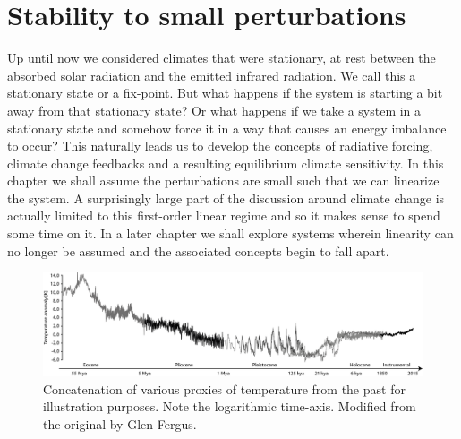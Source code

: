 \documentclass[12pt]{book}
\begin{document}
\chapter{Stability to small perturbations}

Up until now we considered climates that were stationary, at rest between the absorbed solar radiation and the emitted infrared radiation. We call this a stationary state or a fix-point. But what happens if the system is starting a bit away from that stationary state? Or what happens if we take a system in a stationary state and somehow force it in a way that causes an energy imbalance to occur? This naturally leads us to develop the concepts of radiative forcing, climate change feedbacks and a resulting equilibrium climate sensitivity.
In this chapter we shall assume the perturbations are small such that we can linearize the system.  A surprisingly large part of the discussion around climate change is actually limited to this first-order linear regime and so it makes sense to spend some time on it. In a later chapter we shall explore systems wherein linearity can no longer be assumed and the associated concepts begin to fall apart.

\begin{figure}
\begin{center}
\includegraphics[width=15 cm]{../external_figures/Paleo_temperature_timeseries}
\end{center}
\caption{ Concatenation of various proxies of temperature from the past for illustration purposes. Note the logarithmic time-axis. Modified from the original by Glen Fergus. } 
\label{fig:Paleo_temperature_timeseries}
\end{figure}
\end{document}
